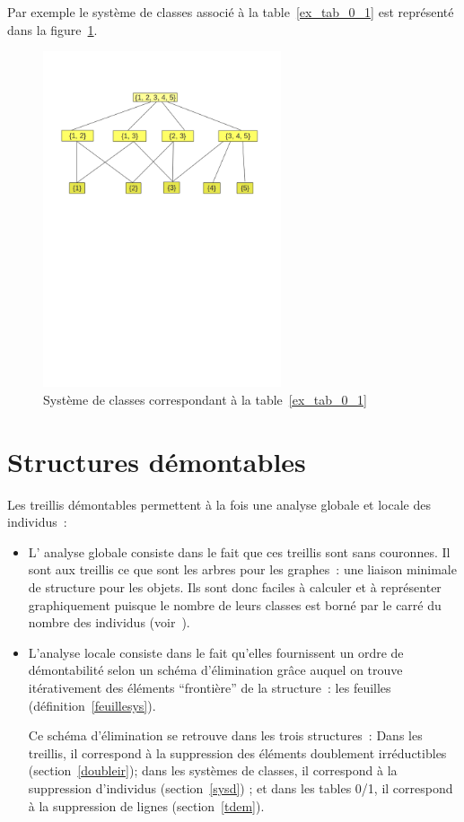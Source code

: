 \documentclass[a4paper]{report}
\begin{document}
Par exemple le système de classes associé à la table~\ref{ex_tab_0_1} est représenté dans la figure~\ref{Fig:treillis.moins}.

\begin{figure}
\begin{center}
\includegraphics[width=7cm]{images/treillismoins}
\end{center}
\caption{ Système de classes correspondant à la table~\ref{ex_tab_0_1}}
\label{Fig:treillis.moins}
\end{figure}

\chapter{Structures démontables}
\label{structuredemonta}

Les treillis démontables permettent à la fois une analyse globale et locale des individus~:
\begin{itemize}
 \item L' analyse globale consiste dans le fait que ces treillis sont sans couronnes. Il sont aux treillis ce que sont les arbres pour les 
graphes~: une liaison minimale de structure pour les objets. Ils sont donc faciles à calculer et à représenter graphiquement puisque le nombre de leurs classes 
est borné par le carré du nombre des individus (voir~\cite{par_clu}).

 \item L'analyse locale consiste dans le fait qu'elles fournissent un ordre de démon\-tabilité selon un schéma d'élimination grâce auquel on trouve 
itérativement des éléments ``frontière'' de la structure~: les feuilles (définition~\ref{feuillesys}).

Ce schéma d'élimination se retrouve dans les trois structures~: Dans les treillis, il correspond à la suppression des éléments doublement irrédu\-ctibles
(section~\ref{doubleir}); dans les systèmes de classes, il correspond à la suppression d'individus (section~\ref{sysd}) ; et dans les tables 0/1, 
il correspond à la suppression de lignes (section~\ref{tdem}).

\end{itemize}
\end{document}
